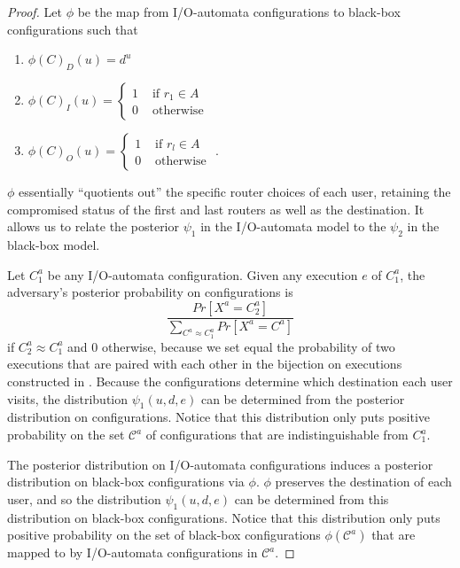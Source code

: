 \documentclass[prodmode,acmtissec]{acmsmall}
\begin{document}
\begin{proof}
Let $\phi$ be the map from I/O-automata configurations to black-box configurations such that
\begin{enumerate}
\item $\phi(C)_D(u) = d^u$
\item $\phi(C)_I(u) = \left\{ \begin{array}{ll} 1 & \textrm{ if } r_1\in A\\ 0 & \textrm{ otherwise } \end{array} \right.$
\item $\phi(C)_O(u) = \left\{ \begin{array}{ll} 1 & \textrm{ if } r_l\in A\\ 0 & \textrm{ otherwise } \end{array} \right.$.
\end{enumerate}
$\phi$ essentially ``quotients out''  the specific router choices of each user, retaining the compromised status of the first and last routers as well as the destination.   It allows us to relate the posterior $\psi_1$ in the I/O-automata model to the $\psi_2$ in the black-box model.

Let $C_1^a$ be any I/O-automata configuration.  Given any execution $e$ of $C_1^a$, the adversary's posterior probability on configurations is
\begin{equation*}
\frac{Pr[X^a = C_2^a]}{\sum_{C^a \approx C_1^a} Pr[X^a = C^a]}
\end{equation*}
if $C_2^a \approx C_1^a$ and $0$ otherwise, because we set equal the probability of two executions that are paired with each other in the bijection on executions constructed in .  Because the configurations determine which destination each user visits, the distribution $\psi_1(u,d,e)$ can be determined from the posterior distribution on configurations.  Notice that this distribution only puts positive probability on the set $\mathcal{C}^a$ of configurations that are indistinguishable from $C_1^a$.

The posterior distribution on I/O-automata configurations induces a posterior distribution on black-box configurations via $\phi$.  $\phi$ preserves the destination of each user, and so the distribution $\psi_1(u,d,e)$ can be determined from this distribution on black-box configurations.  Notice that this distribution only puts positive probability on the set of black-box configurations $\phi(\mathcal{C}^a)$ that are mapped to by I/O-automata configurations in $\mathcal{C}^a$.


\end{proof}
\end{document}
